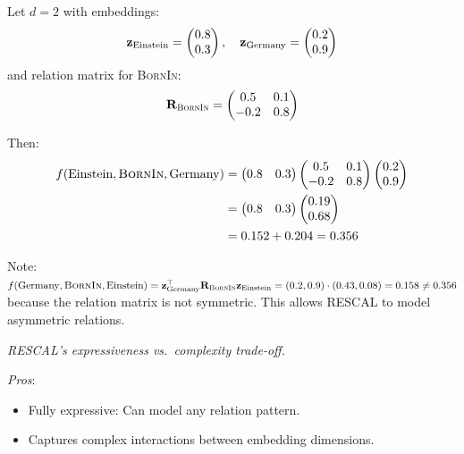 \begin{notechapter}
\begin{example}
Let $d = 2$ with embeddings:
\[
\mathbf{z}_{\text{Einstein}} = \begin{pmatrix} 0.8 \\ 0.3 \end{pmatrix}, \quad
\mathbf{z}_{\text{Germany}} = \begin{pmatrix} 0.2 \\ 0.9 \end{pmatrix}
\]
and relation matrix for \textsc{BornIn}:
\[
\mathbf{R}_{\textsc{BornIn}} = \begin{pmatrix} 0.5 & 0.1 \\ -0.2 & 0.8 \end{pmatrix}
\]

Then:
\begin{align*}
f(\text{Einstein}, \textsc{BornIn}, \text{Germany}) &= \begin{pmatrix} 0.8 & 0.3 \end{pmatrix}
\begin{pmatrix} 0.5 & 0.1 \\ -0.2 & 0.8 \end{pmatrix}
\begin{pmatrix} 0.2 \\ 0.9 \end{pmatrix} \\
&= \begin{pmatrix} 0.8 & 0.3 \end{pmatrix} \begin{pmatrix} 0.19 \\ 0.68 \end{pmatrix} \\
&= 0.152 + 0.204 = 0.356
\end{align*}

Note: $f(\text{Germany}, \textsc{BornIn}, \text{Einstein}) = \mathbf{z}_{\text{Germany}}^\top\mathbf{R}_{\textsc{BornIn}}\mathbf{z}_{\text{Einstein}} = (0.2, 0.9)\cdot(0.43, 0.08) = 0.158 \neq 0.356$ because the relation matrix is not symmetric. This allows RESCAL to model asymmetric relations.
\end{example}

\begin{keyidea}
\emph{RESCAL's expressiveness vs.\ complexity trade-off.}

\emph{Pros}:
\begin{itemize}
    \item Fully expressive: Can model any relation pattern.
    \item Captures complex interactions between embedding dimensions.
\end{itemize}


\end{keyidea}
\end{notechapter}
